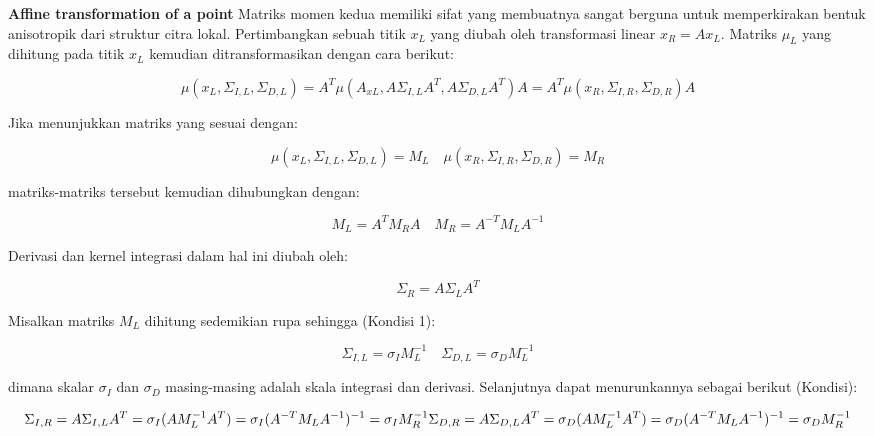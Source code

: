 \textbf{Affine transformation of a point} Matriks momen kedua memiliki sifat yang membuatnya sangat berguna 
untuk memperkirakan bentuk anisotropik dari struktur citra lokal. Pertimbangkan sebuah titik \(x_{L}\) yang 
diubah oleh transformasi linear \(x_{R} = Ax_{L}\). Matriks \(\mu_{L}\) yang dihitung pada titik \(x_{L}\) 
kemudian ditransformasikan dengan cara berikut:

\begin{equation}
  \mu(x_{L},\Sigma_{I,L},\Sigma_{D,L}) = A^{T}\mu(A_{xL},A\Sigma_{I,L}A^{T},A\Sigma_{D,L}A^{T})A = A^{T}\mu(x_{R},\Sigma_{I,R},\Sigma_{D,R})A
\end{equation}

Jika menunjukkan matriks yang sesuai dengan:

\begin{equation*}
  \mu(x_{L},\Sigma_{I,L},\Sigma_{D,L}) = M_{L} \quad \mu(x_{R},\Sigma_{I,R},\Sigma_{D,R}) = M_{R}
\end{equation*}


matriks-matriks tersebut kemudian dihubungkan dengan:

\begin{equation}
  M_{L} = A^{T}M_{R}A \quad M_{R} = A^{-T}M_{L}A^{-1}
\end{equation}

Derivasi dan kernel integrasi dalam hal ini diubah oleh:

\begin{equation*}
  \Sigma_{R} = A\Sigma_{L}A^{T}
\end{equation*}

Misalkan matriks \(M_{L}\) dihitung sedemikian rupa sehingga (Kondisi 1):

\begin{equation}
  \Sigma_{I,L}=\sigma_{I}M_{L}^{-1} \quad \Sigma_{D,L}=\sigma_{D}M_{L}^{-1}
\end{equation}

dimana skalar \(\sigma_{I}\) dan \(\sigma_{D}\) masing-masing adalah skala integrasi dan derivasi. 
Selanjutnya dapat menurunkannya sebagai berikut (Kondisi):

\begin{equation}
  \Sigma_{I,R} = A\Sigma_{I,L}A^{T} = \sigma_{I}(AM_{L}^{-1}A^{T}) = \sigma_{I}(A^{-T}M_{L}A^{-1})^{-1} = \sigma_{I}M_{R}^{-1} \\
  \Sigma_{D,R} = A\Sigma_{D,L}A^{T} = \sigma_{D}(AM_{L}^{-1}A^{T}) = \sigma_{D}(A^{-T}M_{L}A^{-1})^{-1} = \sigma_{D}M_{R}^{-1}
\end{equation}


